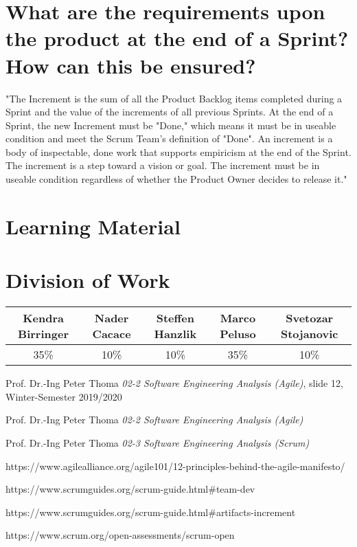 \documentclass[a4paper, 12pt]{article}
\begin{document}
\section{What are the requirements upon the product at the end of a Sprint? How can this be ensured?}

"The Increment is the sum of all the Product Backlog items completed during a Sprint and the value of the increments of all previous Sprints. At the end of a Sprint, the new Increment must be "Done," which means it must be in useable condition and meet the Scrum Team’s definition of "Done". An increment is a body of inspectable, done work that supports empiricism at the end of the Sprint. The increment is a step toward a vision or goal. The increment must be in useable condition regardless of whether the Product Owner decides to release it." \cite{scrumguide2}

\section{Learning Material}

\newpage

\section{Division of Work}
\renewcommand{\arraystretch}{1.5}
\begin{tabular}{|c|c|c|c|c|}
\hline
Kendra Birringer    & Nader Cacace  & Steffen Hanzlik   & Marco Peluso  & Svetozar Stojanovic\\
\hline
35\%                & 10\%          & 10\%              & 35\%          & 10\%\\
\hline
\end{tabular}
\newpage

\begin{thebibliography}{2}

Prof. Dr.-Ing Peter Thoma \emph{02-2 Software Engineering Analysis (Agile)}, 
slide 12, Winter-Semester 2019/2020

Prof. Dr.-Ing Peter Thoma \emph{02-2 Software Engineering Analysis (Agile)}

Prof. Dr.-Ing Peter Thoma \emph{02-3 Software Engineering Analysis (Scrum)}

https://www.agilealliance.org/agile101/12-principles-behind-the-agile-manifesto/

https://www.scrumguides.org/scrum-guide.html\#team-dev

https://www.scrumguides.org/scrum-guide.html\#artifacts-increment

https://www.scrum.org/open-assessments/scrum-open

\newpage
\end{thebibliography}
\end{document}
